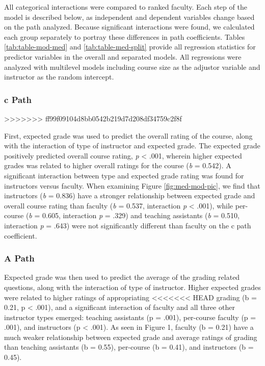 \documentclass[,man]{apa6}
\theoremstyle{definition}
\theoremstyle{definition}
\theoremstyle{definition}
\theoremstyle{remark}
\begin{document}
All categorical interactions were compared to ranked faculty. Each step
of the model is described below, as independent and dependent variables
change based on the path analyzed. Because significant interactions were
found, we calculated each group separately to portray these differences
in path coefficients. Tables \ref{tab:table-mod-med} and
\ref{tab:table-med-split} provide all regression statistics for
predictor variables in the overall and separated models. All regressions
were analyzed with multilevel models including course size as the
adjustor variable and instructor as the random intercept.

\hypertarget{c-path}{%
\subsubsection{c Path}\label{c-path}}
>>>>>>> ff99f09104d8bb0542b219d7d208df34759c2f8f

First, expected grade was used to predict the overall rating of the
course, along with the interaction of type of instructor and expected
grade. The expected grade positively predicted overall course rating,
\emph{p} \textless{} .001, wherein higher expected grades was related to
higher overall ratings for the course (\emph{b} = 0.542). A significant
interaction between type and expected grade rating was found for
instructors versus faculty. When examining Figure \ref{fig:med-mod-pic},
we find that instructors (\emph{b} = 0.836) have a stronger relationship
between expected grade and overall course rating than faculty (\emph{b}
= 0.537, interaction \emph{p} \textless{} .001), while per-course
(\emph{b} = 0.605, interaction \emph{p} = .329) and teaching assistants
(\emph{b} = 0.510, interaction \emph{p} = .643) were not significantly
different than faculty on the c path coefficient.

\subsubsection{A Path}\label{a-path}

Expected grade was then used to predict the average of the grading
related questions, along with the interaction of type of instructor.
Higher expected grades were related to higher ratings of appropriating
<<<<<<< HEAD
grading (b = 0.21, p \textless{} .001), and a significant interaction of
faculty and all three other instructor types emerged: teaching
assistants (p = .001), per-course faculty (p = .001), and instructors (p
\textless{} .001). As seen in Figure 1, faculty (b = 0.21) have a much
weaker relationship between expected grade and average ratings of
grading than teaching assistants (b = 0.55), per-course (b = 0.41), and
instructors (b = 0.45).
\end{document}
